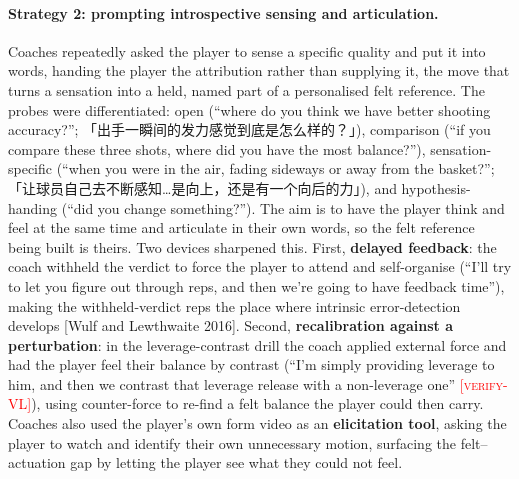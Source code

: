 \documentclass[sigconf]{acmart}
\newcommand{\vf}[1]{\textcolor{red}{[\textsc{#1}]}}
\begin{document}
\paragraph{Strategy 2: prompting introspective sensing and articulation.} Coaches repeatedly asked the player to sense a specific quality and put it into words, handing the player the attribution rather than supplying it, the move that turns a sensation into a held, named part of a personalised felt reference. The probes were differentiated: open (``where do you think we have better shooting accuracy?''; 「出手一瞬间的发力感觉到底是怎么样的？」), comparison (``if you compare these three shots, where did you have the most balance?''), sensation-specific (``when you were in the air, fading sideways or away from the basket?''; 「让球员自己去不断感知…是向上，还是有一个向后的力」), and hypothesis-handing (``did you change something?''). The aim is to have the player think and feel at the same time and articulate in their own words, so the felt reference being built is theirs. Two devices sharpened this. First, \textbf{delayed feedback}: the coach withheld the verdict to force the player to attend and self-organise (``I'll try to let you figure out through reps, and then we're going to have feedback time''), making the withheld-verdict reps the place where intrinsic error-detection develops [Wulf and Lewthwaite 2016]. Second, \textbf{recalibration against a perturbation}: in the leverage-contrast drill the coach applied external force and had the player feel their balance by contrast (``I'm simply providing leverage to him, and then we contrast that leverage release with a non-leverage one'' \vf{verify-VL}), using counter-force to re-find a felt balance the player could then carry. Coaches also used the player's own form video as an \textbf{elicitation tool}, asking the player to watch and identify their own unnecessary motion, surfacing the felt--actuation gap by letting the player see what they could not feel.
\end{document}
